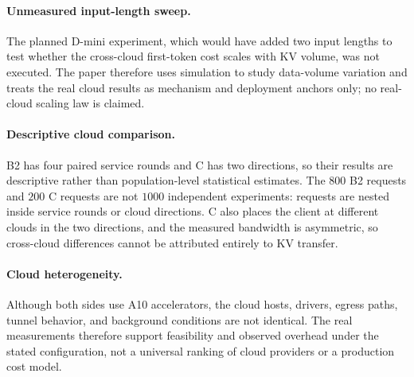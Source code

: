 \paragraph{Unmeasured input-length sweep.} The planned D-mini experiment, which would have added
two input lengths to test whether the cross-cloud first-token cost scales with KV volume, was not
executed. The paper therefore uses simulation to study data-volume variation and treats the real
cloud results as mechanism and deployment anchors only; no real-cloud scaling law is claimed.

\paragraph{Descriptive cloud comparison.} B2 has four paired service rounds and C has two
directions, so their results are descriptive rather than population-level statistical estimates.
The $800$ B2 requests and $200$ C requests are not $1000$ independent experiments: requests are
nested inside service rounds or cloud directions. C also places the client at different clouds in
the two directions, and the measured bandwidth is asymmetric, so cross-cloud differences cannot
be attributed entirely to KV transfer.

\paragraph{Cloud heterogeneity.} Although both sides use A10 accelerators, the cloud hosts,
drivers, egress paths, tunnel behavior, and background conditions are not identical. The real
measurements therefore support feasibility and observed overhead under the stated configuration,
not a universal ranking of cloud providers or a production cost model.
